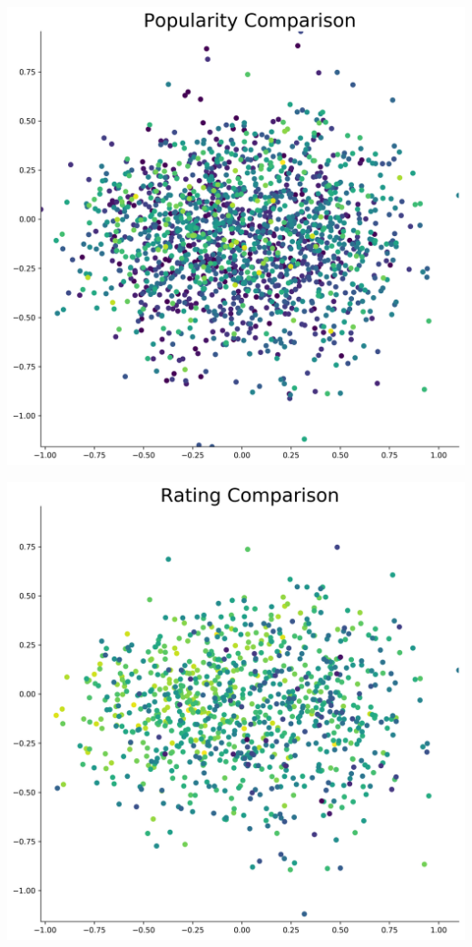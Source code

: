 \begin{appendices}
\begin{center}
\label{appendix:matrixvisual}
\begin{minipage}{0.48\linewidth}
\label{appendix:viz-Popularity}
\includegraphics[scale=0.35]{"Popularity Comparison"}
\captionsetup{width=.85\linewidth}
\end{minipage}
\hfill %
\begin{minipage}{0.48\linewidth}
\label{appendix:viz-Rating}
\includegraphics[scale=0.35]{"Rating Comparison"}

\end{minipage}
\end{center}
\end{appendices}
